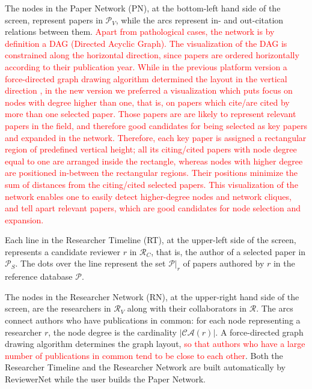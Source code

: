 The nodes in the Paper Network (PN), at the bottom-left hand side of the screen, represent papers in $\mathcal{P}_{V}$, while the arcs represent in- and out-citation relations between them. \textcolor{red}{Apart from pathological cases, the network is by definition a DAG (Directed Acyclic Graph). The visualization \textcolor{red}{of the DAG is constrained along the horizontal direction, since} papers are ordered horizontally according to their publication year. While in the previous platform version \cite{stag19} a force-directed graph drawing algorithm determined the layout in the vertical direction \cite{D3js11}, in the new version we preferred a visualization which puts focus on nodes with degree higher than one, that is, on papers which cite/are cited by more than one selected paper. Those papers are are likely to represent relevant papers in the field, and therefore good candidates for being selected as key papers and expanded in the network. Therefore, each key paper is assigned a rectangular region of predefined vertical height; all its citing/cited papers with node degree equal to one are arranged inside the rectangle, whereas nodes with higher degree are positioned in-between the rectangular regions. Their positions minimize the sum of distances from the citing/cited selected papers. This visualization of the network enables one to easily detect higher-degree nodes and network cliques, and tell apart relevant papers, which are good candidates for node selection and expansion.} 

Each line in the Researcher Timeline (RT), at the upper-left side of the screen, represents a candidate reviewer $r$ in $\mathcal{R}_{C}$, that is, the author of a selected paper in $\mathcal{P}_{S}$. The dots over the line represent the set $\mathcal{P}|_{r}$ of papers authored by $r$ in the reference database $\mathcal{P}$. %

The nodes in the Researcher Network (RN), at the upper-right hand side of the screen, are the researchers in $\mathcal{R}_V$ along with their collaborators in $\mathcal{R}$. The arcs connect authors who have publications in common: for each node representing a researcher $r$, the node degree is the cardinality $\vert \mathcal{CA}(r) \vert$. A force-directed graph drawing algorithm determines the graph layout, \textcolor{red}{so that authors who have a large number of publications in common tend to be close to each other}. Both the Researcher Timeline and the Researcher Network are built automatically by ReviewerNet while the user builds the Paper Network.  

